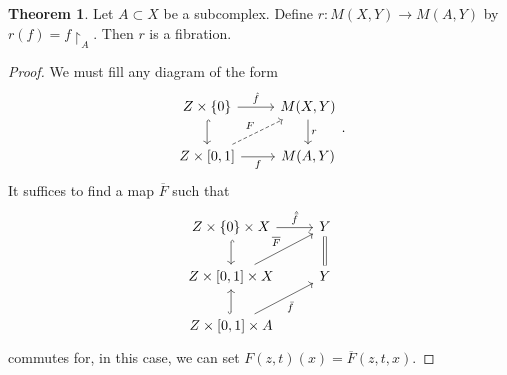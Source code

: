 \documentclass[10pt,letterpaper,cm]{nupset}
\theoremstyle{definition}
\theoremstyle{theorem}
\newtheorem{theorem}[defn]{Theorem}
\theoremstyle{remark}
\newcommand{\1}{\mathbb{1}}
\newcommand{\0}{\vec 0}
\begin{document}
\begin{theorem}
Let $A\subset X$ be a subcomplex. Define $r: M(X, Y) \to M(A, Y)$ by $r(f) = f\restriction_A$. Then $r$ is a fibration. 
\end{theorem}
\begin{proof}
We must fill any diagram of the form
\[
\begin{tikzcd}
Z\times \{0\} \arrow[r, "\hat{f}"] \arrow[d, hook]                 & {M(X,Y)} \arrow[d, "r"] \\
{Z\times [0,1]} \arrow[ru, "F", dashed] \arrow[r, "f"'] & {M(A,Y)}               
\end{tikzcd}
.\] It suffices to find a map $\overline{F}$ such that
\[
\begin{tikzcd}
Z\times \{0\}\times X \arrow[r, "\hat{\bar{f}}"] \arrow[d, hook] & Y \arrow[d, equals] \\
{Z\times [0,1]\times X} \arrow[ru, "\overline{F}"]               & Y           \\
{Z\times [0,1]\times A} \arrow[u, hook] \arrow[ru, "\bar{f}"']   &            
\end{tikzcd}
\] commutes for, in this case, we can set $F(z,t)(x) = \overline{F}(z, t, x)$.


\end{proof}
\end{document}

